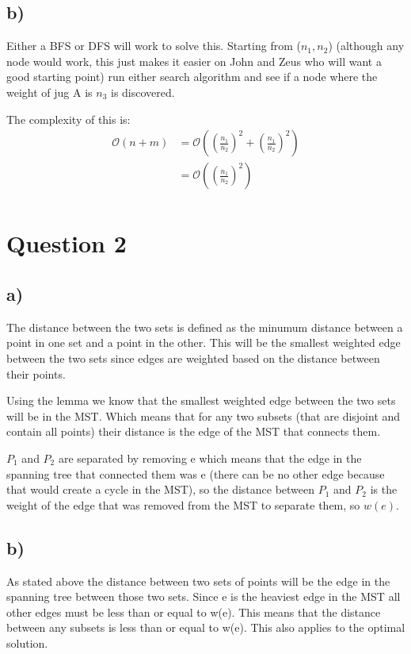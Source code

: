 \documentclass[12pt]{article}
\begin{document}
\subsection*{b)}
Either a BFS or DFS will work to solve this. Starting from ($n_1,n_2$) (although any node would work, this just makes it easier on John and Zeus who will want a good starting point) run either search algorithm and see if a node where the weight of jug A is $n_3$ is discovered.

The complexity of this is:
\begin{align*}
    \mathcal{O}(n+m) &= \mathcal{O}((\frac{n_1}{n_2})^2 + (\frac{n_1}{n_2})^2)\\
                     &= \mathcal{O}((\frac{n_1}{n_2})^2)\\
\end{align*}

\section*{Question 2}
\subsection*{a)}
The distance between the two sets is defined as the minumum distance between a point in one set and a point in the other. This will be the smallest weighted edge between the two sets since edges are weighted based on the distance between their points.

Using the lemma we know that the smallest weighted edge between the two sets will be in the MST. Which means that for any two subsets (that are disjoint and contain all points) their distance is the edge of the MST that connects them.

$P_1$ and $P_2$ are separated by removing e which means that the edge in the spanning tree that connected them was e (there can be no other edge because that would create a cycle in the MST), so the distance between $P_1$ and $P_2$ is the weight of the edge that was removed from the MST to separate them, so $w(e)$.

\subsection*{b)}
As stated above the distance between two sets of points will be the edge in the spanning tree between those two sets. Since e is the heaviest edge in the MST all other edges must be less than or equal to w(e). This means that the distance between any subsets is less than or equal to w(e). This also applies to the optimal solution.
\end{document}
